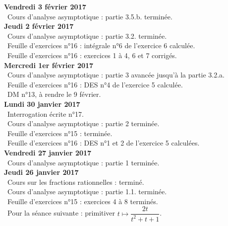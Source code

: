 \documentclass[12pt,a4paper]{article}
\begin{document}
\noindent\textbf{Vendredi 3 février 2017}\\
\bu\ Cours d'analyse asymptotique : partie 3.5.b. terminée.\vspace{.4cm}\\

\noindent\textbf{Jeudi 2 février 2017}\\
\bu\ Cours d'analyse asymptotique : partie 3.2. terminée.\\
\bu\ Feuille d'exercices n°16 : intégrale n°6 de l'exercice 6 calculée.\\
\bu\ Feuille d'exercices n°16 : exercices 1 à 4, 6 et 7 corrigés.\vspace{.4cm}\\

\noindent\textbf{Mercredi 1er février 2017}\\
\bu\ Cours d'analyse asymptotique : partie 3 avancée jusqu'à la partie 3.2.a.\\
\bu\ Feuille d'exercices n°16 : DES n°4 de l'exercice 5 calculée.\\
\bu\ DM n°13, à rendre le 9 février.\vspace{.4cm}\\

\noindent\textbf{Lundi 30 janvier 2017}\\
\bu\ Interrogation écrite n°17.\\
\bu\ Cours d'analyse asymptotique : partie 2 terminée.\\
\bu\ Feuille d'exercices n°15 : terminée.\\
\bu\ Feuille d'exercices n°16 : DES n°1 et 2 de l'exercice 5 calculées.\vspace{.4cm}\\

\noindent\textbf{Vendredi 27 janvier 2017}\\
\bu\ Cours d'analyse asymptotique : partie 1 terminée. \vspace{.4cm}\\

\noindent\textbf{Jeudi 26 janvier 2017}\\
\bu\ Cours sur les fractions rationnelles : terminé.\\
\bu\ Cours d'analyse asymptotique : partie 1.1. terminée.\\
\bu\ Feuille d'exercices n°15 : exercices 4 à 8 terminés.\\
\bu\ Pour la séance suivante : primitiver $t\mapsto \dfrac{2t}{t^2+t+1}$.\vspace{.4cm}\\
\end{document}
